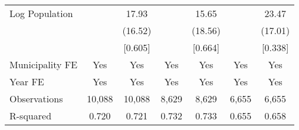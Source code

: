 \documentclass[]{article}
\begin{document}
\begin{adjustbox}{max width=\textwidth}
\begin{tabular}{lcccccc}
Log Population & & 17.93 & & 15.65 & & 23.47 \\
& & (16.52) & & (18.56) & & (17.01) \\
& & [0.605] & & [0.664] & & [0.338] \\

\midrule
Municipality FE & Yes & Yes & Yes & Yes & Yes & Yes \\
Year FE & Yes & Yes & Yes & Yes & Yes & Yes \\
Observations & 10,088 & 10,088 & 8,629 & 8,629 & 6,655 & 6,655 \\
R-squared & 0.720 & 0.721 & 0.732 & 0.733 & 0.655 & 0.658 \\
\bottomrule
\end{tabular}
\end{adjustbox}
\end{document}
